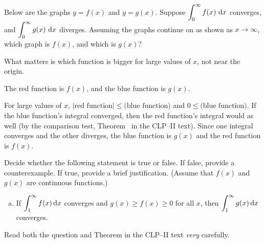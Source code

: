 \begin{Mquestion}
Below are the graphs $y=f(x)$ and $y=g(x)$. Suppose $\displaystyle\int_0^\infty f(x)~\mathrm{d}x$ converges, and $\displaystyle\int_0^\infty g(x)~\mathrm{d}x$ diverges. Assuming the graphs continue on as shown as $x \to \infty$, which graph is $f(x)$, and which is $g(x)$?
\begin{center}
\end{center}

\end{Mquestion}
\begin{hint}
What matters is which function is bigger for large values of $x$, not  near the origin.
\end{hint}
\begin{answer}
The red function is $f(x)$, and the blue function is $g(x)$.
\end{answer}
\begin{solution}
For large values of $x$, $|\text{red function}|\leq \text{(blue function)}$ and $0 \leq \text{(blue function)}$. If the blue function's integral converged, then the red function's integral would as well (by the comparison test, Theorem~ in the CLP--II text). Since one integral converges and the other diverges, the blue function is $g(x)$ and the red function is $f(x)$.
\end{solution}
\begin{question}[2015A]
Decide whether the following statement is true or false.
If false, provide a counterexample. If true, provide a brief justification.
(Assume that $f(x)$ and $g(x)$ are continuous functions.)

\begin{enumerate}[(a)]
\item []
If $\displaystyle\int_{1}^{\infty} f(x) \,\mathrm{d}x$ converges and $g(x)\ge f(x)\ge 0$ for all $x$, then $\displaystyle\int_{1}^{\infty} g(x) \,\mathrm{d}x$ converges.
\end{enumerate}
\end{question}

\begin{hint}
Read both the question and Theorem  in the
CLP--II text \emph{very} carefully.
\end{hint}

